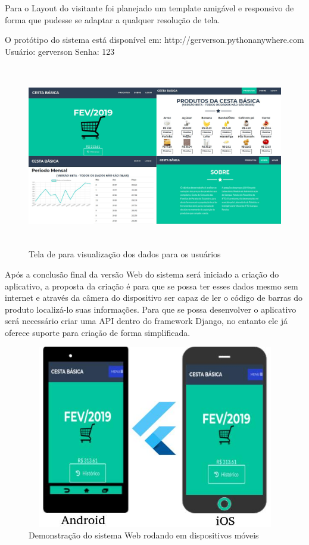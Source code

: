 \documentclass{ifto-tex}
\begin{document}
Para o Layout do visitante foi planejado um template amigável e responsivo de forma que pudesse se adaptar a qualquer resolução de tela.

O protótipo do sistema está disponível em: http://gerverson.pythonanywhere.com
Usuário: gerverson Senha: 123
	\begin{figure}[!h]
	\begin{center}
		\includegraphics[width=16.0cm, height= 8.0cm]{cestauser.jpeg}    %
		\caption{Tela de para visualização dos dados para os usuários} 
		\label{fig:faces}
	\end{center}
\end{figure}

Após a conclusão final da versão Web do sistema será iniciado a criação do aplicativo, a proposta da criação é para que se possa ter esses dados mesmo sem internet e através da câmera do dispositivo ser capaz de ler o código de barras do produto localizá-lo suas informações.
Para que se possa desenvolver o aplicativo será necessário criar uma API dentro do framework Django, no entanto ele já oferece suporte para criação de forma simplificada.

	\begin{figure}[!h]
	\begin{center}
		\includegraphics[width=12.0cm, height= 8.0cm]{cestadispositovos.jpeg}    %
		\caption{Demonstração do sistema Web rodando em dispositivos móveis} 
		\label{fig:faces}
	\end{center}
\end{figure}
\end{document}
